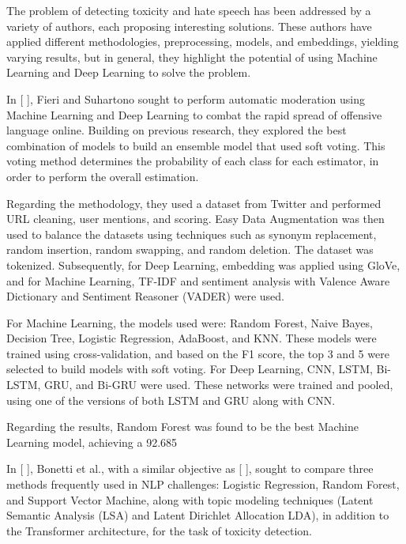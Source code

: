 The problem of detecting toxicity and hate speech has been addressed by a variety of authors, each proposing interesting solutions. These authors have applied different methodologies, preprocessing, models, and embeddings, yielding varying results, but in general, they highlight the potential of using Machine Learning and Deep Learning to solve the problem.

In [ ], Fieri and Suhartono sought to perform automatic moderation using Machine Learning and Deep Learning to combat the rapid spread of offensive language online. Building on previous research, they explored the best combination of models to build an ensemble model that used soft voting. This voting method determines the probability of each class for each estimator, in order to perform the overall estimation.

Regarding the methodology, they used a dataset from Twitter and performed URL cleaning, user mentions, and scoring. Easy Data Augmentation was then used to balance the datasets using techniques such as synonym replacement, random insertion, random swapping, and random deletion. The dataset was tokenized. Subsequently, for Deep Learning, embedding was applied using GloVe, and for Machine Learning, TF-IDF and sentiment analysis with Valence Aware Dictionary and Sentiment Reasoner (VADER) were used.

For Machine Learning, the models used were: Random Forest, Naive Bayes, Decision Tree, Logistic Regression, AdaBoost, and KNN. These models were trained using cross-validation, and based on the F1 score, the top 3 and 5 were selected to build models with soft voting. For Deep Learning, CNN, LSTM, Bi-LSTM, GRU, and Bi-GRU were used. These networks were trained and pooled, using one of the versions of both LSTM and GRU along with CNN.

Regarding the results, Random Forest was found to be the best Machine Learning model, achieving a 92.685%

In [ ], Bonetti et al., with a similar objective as [ ], sought to compare three methods frequently used in NLP challenges: Logistic Regression, Random Forest, and Support Vector Machine, along with topic modeling techniques (Latent Semantic Analysis (LSA) and Latent Dirichlet Allocation LDA), in addition to the Transformer architecture, for the task of toxicity detection.

